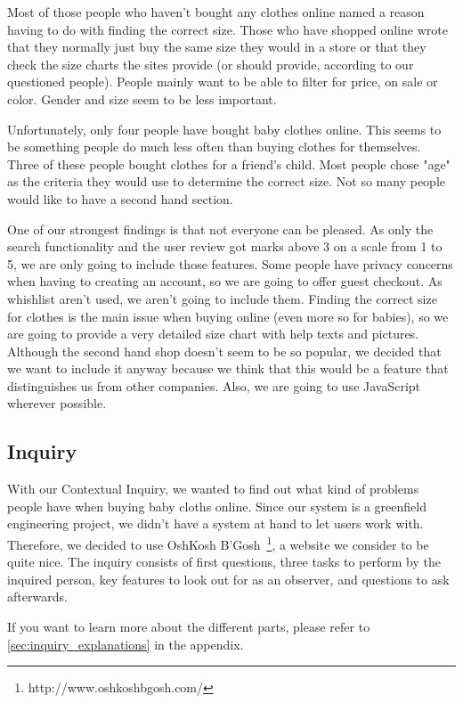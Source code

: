 Most of those people who haven't bought any clothes online named a reason having to do with finding the correct size. Those who have shopped online wrote that they normally just buy the same size they would in a store or that they check the size charts the sites provide (or should provide, according to our questioned people).
People mainly want to be able to filter for price, on sale or color. Gender and size seem to be less important. 

Unfortunately, only four people have bought baby clothes online. This seems to be something people do much less often than buying clothes for themselves. Three of these people bought clothes for a friend's child. Most people chose "age" as the criteria they would use to determine the correct size. Not so many people would like to have a second hand section.

One of our strongest findings is that not everyone can be pleased. As only the search functionality and the user review got marks above 3 on a scale from 1 to 5, we are only going to include those features. Some people have privacy concerns when having to creating an account, so we are going to offer guest checkout. As whishlist aren't used, we aren't going to include them. Finding the correct size for clothes is the main issue when buying online (even more so for babies), so we are going to provide a very detailed size chart with help texts and pictures. Although the second hand shop doesn't seem to be so popular, we decided that we want to include it anyway because we think that this would be a feature that distinguishes us from other companies. Also, we are going to use JavaScript wherever possible.

\subsection{Inquiry}
With our Contextual Inquiry, we wanted to find out what kind of problems people have when buying baby cloths online. 
Since our system is a greenfield engineering project, we didn't have a system at hand to let users work with. Therefore, we decided to use OshKosh B'Gosh~\footnote{http://www.oshkoshbgosh.com/}, a website we consider to be quite nice.
The inquiry consists of first questions, three tasks to perform by the inquired person, key features to look out for as an observer, and questions to ask afterwards.

If you want to learn more about the different parts, please refer to \ref{sec:inquiry_explanations} in the appendix.

